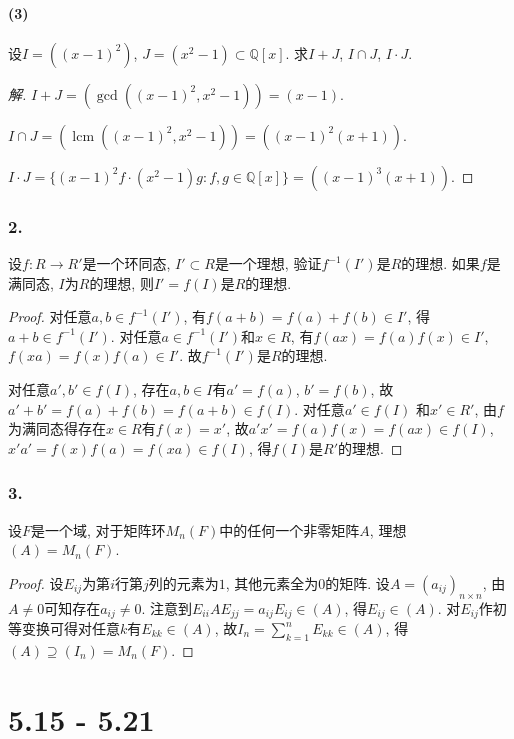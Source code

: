 \documentclass[12pt, a4paper, fontset=windows]{ctexart}
\newcommand{\Q}{\mathbb{Q}}
\newcommand{\lcm}{\operatorname{lcm}}
\newenvironment{solution}{\begin{proof}[解]}{\end{proof}}
\begin{document}
\subsection*{(3)}

设$I=((x-1)^2)$, $J=(x^2-1)\subset\Q[x]$. 求$I+J$, $I\cap J$, $I\cdot J$. 

\begin{solution}
$I+J=(\gcd((x-1)^2,x^2-1))=(x-1)$. 

$I\cap J=(\lcm((x-1)^2,x^2-1))=((x-1)^2(x+1))$. 

$I\cdot J=\{(x-1)^2f\cdot(x^2-1)g:f,g\in\Q[x]\}=((x-1)^3(x+1))$. 
\end{solution}

\section*{2.}

设$f:R\to R'$是一个环同态, $I'\subset R$是一个理想, 验证$f^{-1}(I')$是$R$的理想. 
如果$f$是满同态, $I$为$R$的理想, 则$I'=f(I)$是$R$的理想. 

\begin{proof}
对任意$a,b\in f^{-1}(I')$, 有$f(a+b)=f(a)+f(b)\in I'$, 得$a+b\in f^{-1}(I')$. 
对任意$a\in f^{-1}(I')$和$x\in R$, 有$f(ax)=f(a)f(x)\in I'$, $f(xa)=f(x)f(a)\in I'$. 
故$f^{-1}(I')$是$R$的理想. 

对任意$a',b'\in f(I)$, 存在$a,b\in I$有$a'=f(a)$, $b'=f(b)$, 
故$a'+b'=f(a)+f(b)=f(a+b)\in f(I)$. 对任意$a'\in f(I)$
和$x'\in R'$, 由$f$为满同态得存在$x\in R$有$f(x)=x'$, 
故$a'x'=f(a)f(x)=f(ax)\in f(I)$, $x'a'=f(x)f(a)=f(xa)\in f(I)$, 
得$f(I)$是$R'$的理想. 
\end{proof}

\section*{3.}

设$F$是一个域, 对于矩阵环$M_n(F)$中的任何一个非零矩阵$A$, 理想$(A)=M_n(F)$. 

\begin{proof}
设$E_{ij}$为第$i$行第$j$列的元素为$1$, 其他元素全为$0$的矩阵. 
设$A=(a_{ij})_{n\times n}$, 由$A\ne 0$可知存在$a_{ij}\ne 0$. 
注意到$E_{ii}AE_{jj}=a_{ij}E_{ij}\in(A)$, 得$E_{ij}\in(A)$. 
对$E_{ij}$作初等变换可得对任意$k$有$E_{kk}\in(A)$, 
故$I_n=\sum^n_{k=1}E_{kk}\in(A)$, 得$(A)\supseteq(I_n)=M_n(F)$. 
\end{proof}

\clearpage
\part{5.15 - 5.21}
\end{document}
